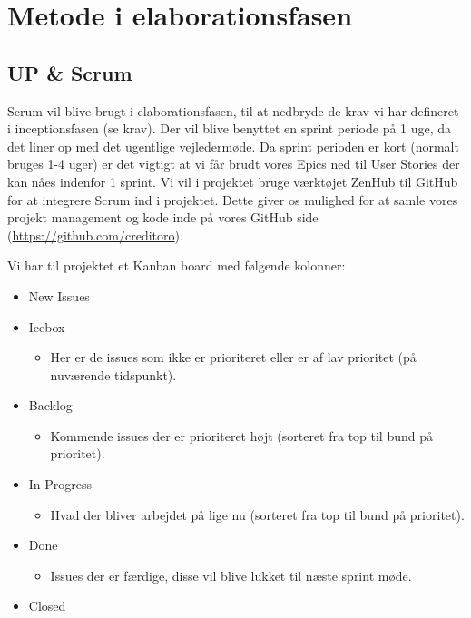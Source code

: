 \section{Metode i elaborationsfasen}


\subsection{UP \& Scrum}

Scrum vil blive brugt i elaborationsfasen, til at nedbryde de krav vi har defineret i inceptionsfasen (se krav). Der vil blive benyttet en sprint periode på 1 uge, da det liner op med det ugentlige vejledermøde. Da sprint perioden er kort (normalt bruges 1-4 uger) er det vigtigt at vi får brudt vores Epics ned til User Stories der kan nåes indenfor 1 sprint.
Vi vil i projektet bruge værktøjet ZenHub til GitHub for at integrere Scrum ind i projektet.
Dette giver os mulighed for at samle vores projekt management og kode inde på vores GitHub side (\url{https://github.com/creditoro}).

\noindent
Vi har til projektet et Kanban board med følgende kolonner:
\begin{itemize}
    \item New Issues
    \item Icebox
    \begin{itemize}
        \item Her er de issues som ikke er prioriteret eller er af lav prioritet (på nuværende tidspunkt).
    \end{itemize}
    \item Backlog
    \begin{itemize}
        \item Kommende issues der er prioriteret højt (sorteret fra top til bund på prioritet).
    \end{itemize}
    \item In Progress
    \begin{itemize}
        \item Hvad der bliver arbejdet på lige nu (sorteret fra top til bund på prioritet).
    \end{itemize}
    \item Done
    \begin{itemize}
        \item Issues der er færdige, disse vil blive lukket til næste sprint møde.
    \end{itemize}
    \item Closed
\end{itemize}
